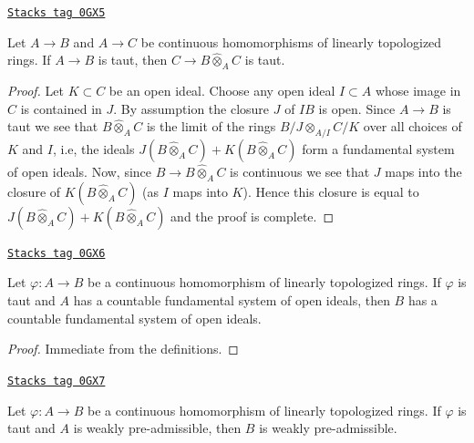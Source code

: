 \begin{lemma}
\label{formal-spaces-lemma-base-change-taut}
\href{https://stacks.math.columbia.edu/tag/0GX5}{\texttt{Stacks tag 0GX5}}

Let $A \to B$ and $A \to C$ be continuous homomorphisms of
linearly topologized rings. If $A \to B$ is taut, then
$C \to B \widehat{\otimes}_A C$ is taut.
\end{lemma}

\begin{proof}
Let $K \subset C$ be an open ideal. Choose any open ideal $I \subset A$
whose image in $C$ is contained in $J$. By assumption the closure $J$
of $IB$ is open. Since $A \to B$ is taut we see that
$B \widehat{\otimes}_A C$ is the limit of the rings $B/J \otimes_{A/I} C/K$
over all choices of $K$ and $I$, i.e,
the ideals $J(B \widehat{\otimes}_A C) + K(B \widehat{\otimes}_A C)$
form a fundamental system of open ideals. Now,
since $B \to B \widehat{\otimes}_A C$ is continuous we see
that $J$ maps into the closure of $K(B \widehat{\otimes}_A C)$
(as $I$ maps into $K$). Hence this closure is equal to
$J(B \widehat{\otimes}_A C) + K(B \widehat{\otimes}_A C)$
and the proof is complete.
\end{proof}

\begin{lemma}
\label{formal-spaces-lemma-taut-ascent-countable}
\href{https://stacks.math.columbia.edu/tag/0GX6}{\texttt{Stacks tag 0GX6}}

Let $\varphi : A \to B$ be a continuous homomorphism of
linearly topologized rings. If $\varphi$ is taut and $A$
has a countable fundamental system of open ideals, then
$B$ has a countable fundamental system of open ideals.
\end{lemma}

\begin{proof}
Immediate from the definitions.
\end{proof}

\begin{lemma}
\label{formal-spaces-lemma-taut-ascent-weakly-admissible}
\href{https://stacks.math.columbia.edu/tag/0GX7}{\texttt{Stacks tag 0GX7}}

Let $\varphi : A \to B$ be a continuous homomorphism of
linearly topologized rings. If $\varphi$ is taut and $A$
is weakly pre-admissible, then $B$ is weakly pre-admissible.
\end{lemma}

